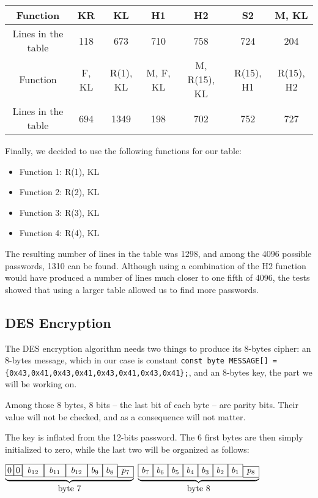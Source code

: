 \documentclass[a4paper,11pt]{article}
\begin{document}
\begin{tabular}{|c|c|c|c|c|c|c|} \hline
Function & KR & KL & H1 & H2 & S2 & M, KL  \\ \hline
Lines in the table & 118 & 673 & 710 & 758 & 724 & 204  \\ \hline
Function & F, KL & R(1), KL & M, F, KL & M, R(15), KL & R(15), H1 & R(15), H2 \\ \hline
Lines in the table & 694 & 1349 & 198 & 702 & 752 & 727 \\ \hline
\end{tabular}
\newline{}
\newline{}

Finally, we decided to use the following functions for our table:
\begin{itemize}
\item Function 1: R(1), KL
\item Function 2: R(2), KL
\item Function 3: R(3), KL
\item Function 4: R(4), KL
\end{itemize}

The resulting number of lines in the table was 1298, and among the 4096 possible passwords, 1310 can be found. Although using a combination of the H2 function would have produced a number of lines much closer to one fifth of 4096, the tests showed that using a larger table allowed us to find more passwords.


\subsection{DES Encryption}
The DES encryption algorithm needs two things to produce its 8-bytes cipher:
an 8-bytes message, which in our case is constant \texttt{const byte MESSAGE[] = \{0x43,0x41,0x43,0x41,0x43,0x41,0x43,0x41\};}, 
and an 8-bytes key, the part we will be working on.

Among those 8 bytes, 8 bits -- the last bit of each byte -- are parity bits.
Their value will not be checked, and as a consequence will not matter.

The key is inflated from the 12-bits password. The 6 first bytes are then simply initialized to zero, while the last two will be organized as follows:

\begin{center}
$\underbrace{\framebox[2\width]{0}\framebox[2\width]{0}\framebox[2\width]{$b_{12}$}\framebox[2\width]{$b_{11}$}\framebox[2\width]{$b_{12}$}\framebox[2\width]{$b_{9}$}\framebox[2\width]{$b_{8}$}\framebox[2\width]{$p_{7}$}}_{\mbox{byte 7}}$
$\underbrace{\framebox[2\width]{$b_{7}$}\framebox[2\width]{$b_{6}$}\framebox[2\width]{$b_{5}$}\framebox[2\width]{$b_{4}$}\framebox[2\width]{$b_{3}$}\framebox[2\width]{$b_{2}$}\framebox[2\width]{$b_{1}$}\framebox[2\width]{$p_{8}$}}_{\mbox{byte 8}}$
\end{center}
\end{document}
